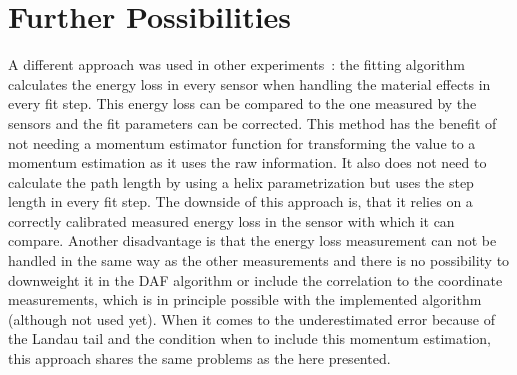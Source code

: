 \section{Further Possibilities}

A different approach was used in other experiments~\cite{sergey}: the fitting algorithm calculates the energy loss in every sensor when handling the material effects in every fit step. This energy loss can be compared to the one measured by the sensors and the fit parameters can be corrected. This method has the benefit of not needing a momentum estimator function for transforming the \dedx value to a momentum estimation as it uses the raw \dedx information. It also does not need to calculate the path length by using a helix parametrization but uses the step length in every fit step. The downside of this approach is, that it relies on a correctly calibrated measured energy loss in the sensor with which it can compare. Another disadvantage is that the energy loss measurement can not be handled in the same way as the other measurements and there is no possibility to downweight it in the DAF algorithm or include the correlation to the coordinate measurements, which is in principle possible with the implemented algorithm (although not used yet). When it comes to the underestimated error because of the Landau tail and the condition when to include this momentum estimation, this approach shares the same problems as the here presented.

% 



